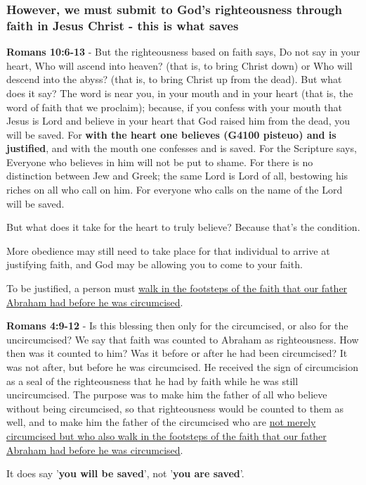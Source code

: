 \documentclass[11pt]{article}
\begin{document}
\subsubsection{However, we must submit to God's righteousness through faith in Jesus Christ - this is what saves}
\label{sec:org30657cc}
\textbf{Romans 10:6-13} - But the righteousness based on faith says, Do not say in your heart, Who will ascend into heaven? (that is, to bring Christ down) or Who will descend into the abyss? (that is, to bring Christ up from the dead).  But what does it say? The word is near you, in your mouth and in your heart (that is, the word of faith that we proclaim); because, if you confess with your mouth that Jesus is Lord and believe in your heart that God raised him from the dead, you will be saved.  For \textbf{with the heart one believes (G4100 pisteuo) and is justified}, and with the mouth one confesses and is saved.  For the Scripture says, Everyone who believes in him will not be put to shame.  For there is no distinction between Jew and Greek; the same Lord is Lord of all, bestowing his riches on all who call on him.  For everyone who calls on the name of the Lord will be saved.

But what does it take for the heart to truly believe? Because that's the condition.

More obedience may still need to take place for that individual to arrive at justifying faith, and God may be allowing you to come to your faith.

To be justified, a person must \uline{walk in the footsteps of the faith that our father Abraham had before he was circumcised}.

\textbf{Romans 4:9-12} - Is this blessing then only for the circumcised, or also for the uncircumcised? We say that faith was counted to Abraham as righteousness. How then was it counted to him? Was it before or after he had been circumcised? It was not after, but before he was circumcised. He received the sign of circumcision as a seal of the righteousness that he had by faith while he was still uncircumcised. The purpose was to make him the father of all who believe without being circumcised, so that righteousness would be counted to them as well, and to make him the father of the circumcised who are \uline{not merely circumcised but who also walk in the footsteps of the faith that our father Abraham had before he was circumcised}.

It does say '\textbf{you will be saved}', not '\textbf{you are saved}'.
\end{document}
